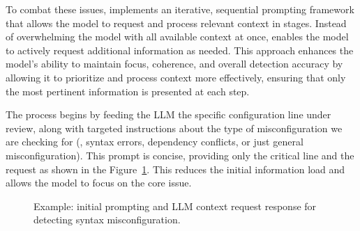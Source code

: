To combat these issues, \sysname{} implements an iterative, sequential prompting framework that allows the model to request and process relevant context in stages. Instead of overwhelming the model with all available context at once, \sysname{} enables the model to actively request additional information as needed. This approach enhances the model’s ability to maintain focus, coherence, and overall detection accuracy by allowing it to prioritize and process context more effectively, ensuring that only the most pertinent information is presented at each step.

 The process begins by feeding the LLM the specific configuration line under review, along with targeted instructions about the type of misconfiguration we are checking for (\eg, syntax errors, dependency conflicts, or just general misconfiguration). This prompt is concise, providing only the critical line and the request as shown in the Figure~\ref{fig:initial_prompt}. This reduces the initial information load and allows the model to focus on the core issue.


    \begin{figure}[tb]
    \centering
    \caption{Example: initial prompting and LLM context request response for detecting syntax misconfiguration.}
    \label{fig:initial_prompt}
\end{figure}

